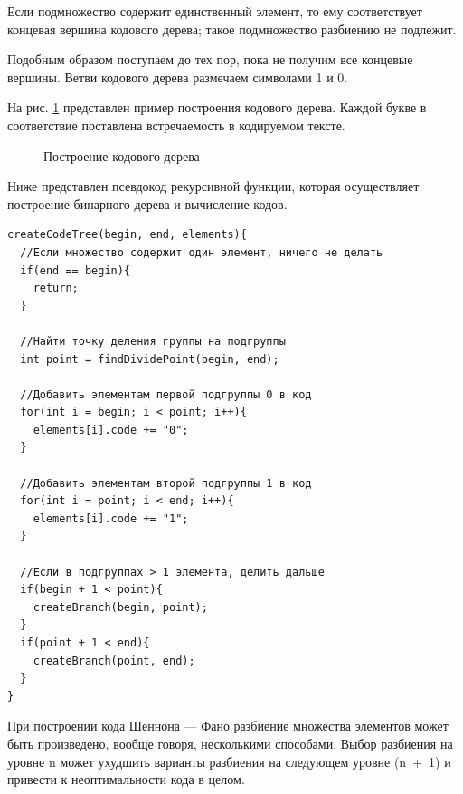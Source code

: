 \documentclass{article}
\begin{document}
Если подмножество содержит 
единственный элемент, то ему соответствует концевая вершина кодового дерева; такое подмножество 
разбиению не подлежит.

Подобным образом поступаем до тех пор, пока не получим все концевые 
вершины. Ветви кодового дерева размечаем символами 1 и 0. 

На рис. \ref{tree} представлен пример 
построения кодового дерева. Каждой букве в соответствие поставлена встречаемость в кодируемом тексте.

\begin{figure}[H]
  \caption{Построение кодового дерева\label{tree}}
\end{figure}

\newpage
Ниже представлен псевдокод рекурсивной функции, которая осуществляет построение бинарного дерева и вычисление кодов.
\begin{lstlisting}
createCodeTree(begin, end, elements){
  //Если множество содержит один элемент, ничего не делать
  if(end == begin){
    return;
  }
  
  //Найти точку деления группы на подгруппы
  int point = findDividePoint(begin, end);
  
  //Добавить элементам первой подгруппы 0 в код
  for(int i = begin; i < point; i++){
    elements[i].code += "0";
  }
  
  //Добавить элементам второй подгруппы 1 в код
  for(int i = point; i < end; i++){
    elements[i].code += "1";
  }
  
  //Если в подгруппах > 1 элемента, делить дальше
  if(begin + 1 < point){
    createBranch(begin, point);
  }
  if(point + 1 < end){
    createBranch(point, end);
  }
}
\end{lstlisting}

При построении кода Шеннона --- Фано разбиение множества элементов может быть произведено, вообще 
говоря, несколькими способами. Выбор разбиения на уровне n может ухудшить варианты разбиения на 
следующем уровне (n~+~1) и привести к неоптимальности кода в целом. 
\end{document}
